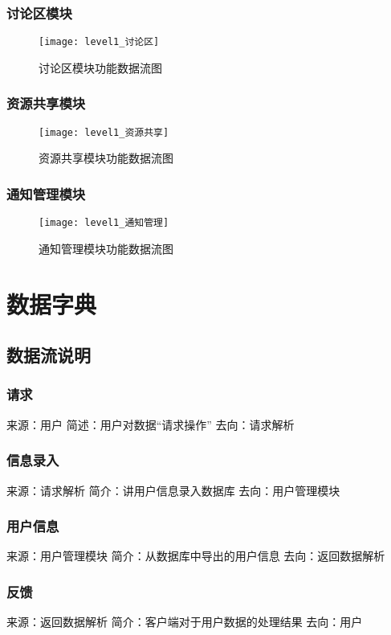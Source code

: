 \subsubsection{讨论区模块}
\begin{figure}[H]
\centering
\texttt{[image: level1\_讨论区]}
\caption{讨论区模块功能数据流图}
\end{figure}
\subsubsection{资源共享模块}
\begin{figure}[H]
\centering
\texttt{[image: level1\_资源共享]}
\caption{资源共享模块功能数据流图}
\end{figure}
\subsubsection{通知管理模块}
\begin{figure}[H]
\centering
\texttt{[image: level1\_通知管理]}
\caption{通知管理模块功能数据流图}
\end{figure}

\section{数据字典}
\subsection{数据流说明}
\subsubsection{请求}
来源：用户
简述：用户对数据“请求操作”
去向：请求解析

\subsubsection{信息录入}
来源：请求解析
简介：讲用户信息录入数据库
去向：用户管理模块

\subsubsection{用户信息}
来源：用户管理模块
简介：从数据库中导出的用户信息
去向：返回数据解析

\subsubsection{反馈}
来源：返回数据解析
简介：客户端对于用户数据的处理结果
去向：用户

